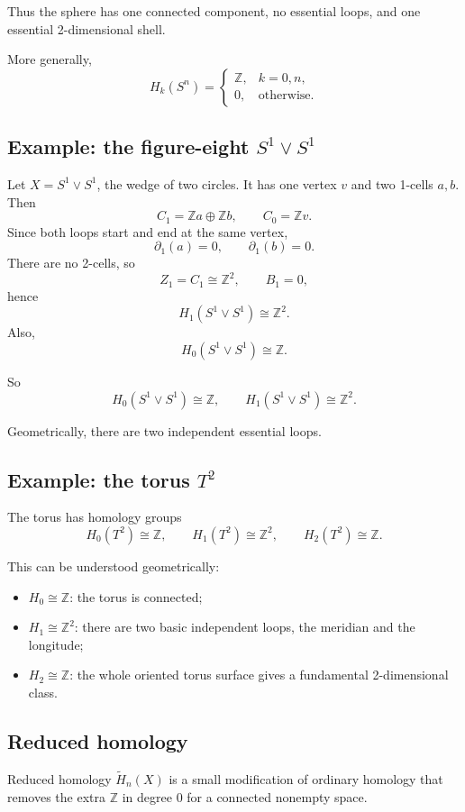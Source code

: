\documentclass[12pt,a4paper]{article}
\theoremstyle{notespace}
\begin{document}
Thus the sphere has one connected component, no essential loops, and one essential 2-dimensional shell.

More generally,
\[
H_k(S^n)=
\begin{cases}
	\mathbb{Z}, & k=0,n,\\
	0, & \text{otherwise}.
\end{cases}
\]

\subsection{Example: the figure-eight \(S^1\vee S^1\)}

Let \(X=S^1\vee S^1\), the wedge of two circles. It has one vertex \(v\) and two 1-cells \(a,b\). Then
\[
C_1=\mathbb{Z}a\oplus \mathbb{Z}b,
\qquad
C_0=\mathbb{Z}v.
\]
Since both loops start and end at the same vertex,
\[
\partial_1(a)=0,
\qquad
\partial_1(b)=0.
\]
There are no 2-cells, so
\[
Z_1=C_1\cong \mathbb{Z}^2,
\qquad
B_1=0,
\]
hence
\[
H_1(S^1\vee S^1)\cong \mathbb{Z}^2.
\]
Also,
\[
H_0(S^1\vee S^1)\cong \mathbb{Z}.
\]

So
\[
H_0(S^1\vee S^1)\cong \mathbb{Z},
\qquad
H_1(S^1\vee S^1)\cong \mathbb{Z}^2.
\]

Geometrically, there are two independent essential loops.

\subsection{Example: the torus \(T^2\)}

The torus has homology groups
\[
H_0(T^2)\cong \mathbb{Z},
\qquad
H_1(T^2)\cong \mathbb{Z}^2,
\qquad
H_2(T^2)\cong \mathbb{Z}.
\]

This can be understood geometrically:
\begin{itemize}
	\item \(H_0\cong \mathbb{Z}\): the torus is connected;
	\item \(H_1\cong \mathbb{Z}^2\): there are two basic independent loops, the meridian and the longitude;
	\item \(H_2\cong \mathbb{Z}\): the whole oriented torus surface gives a fundamental 2-dimensional class.
\end{itemize}

\subsection{Reduced homology}

Reduced homology \(\widetilde{H}_n(X)\) is a small modification of ordinary homology that removes the extra \(\mathbb{Z}\) in degree \(0\) for a connected nonempty space.
\end{document}
